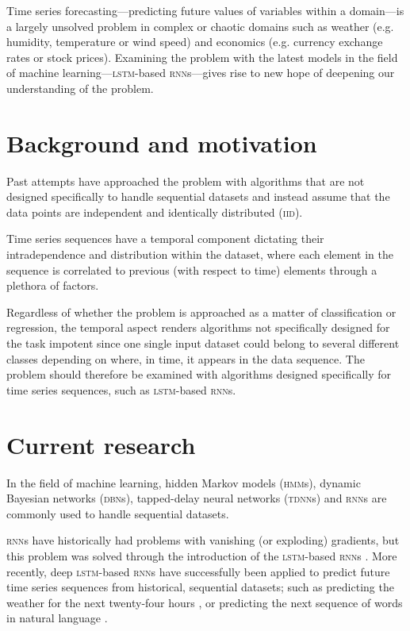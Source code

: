 Time series forecasting---predicting future values of variables within a domain---is a largely unsolved problem in complex or chaotic domains such as weather (e.g. humidity, temperature or wind speed) and economics (e.g. currency exchange rates or stock prices). Examining the problem with the latest models in the field of machine learning---\textsc{lstm}-based \textsc{rnn}s---gives rise to new hope of deepening our understanding of the problem.

\section{Background and motivation}
Past attempts have approached the problem with algorithms that are not designed specifically to handle sequential datasets and instead assume that the data points are independent and identically distributed (\textsc{iid}).

Time series sequences have a temporal component dictating their intradependence and distribution within the dataset, where each element in the sequence is correlated to previous (with respect to time) elements through a plethora of factors.

Regardless of whether the problem is approached as a matter of classification or regression, the temporal aspect renders algorithms not specifically designed for the task impotent since one single input dataset could belong to several different classes depending on where, in time, it appears in the data sequence. The problem should therefore be examined with algorithms designed specifically for time series sequences, such as \textsc{lstm}-based \textsc{rnn}s.

\section{Current research}
In the field of machine learning, hidden Markov models (\textsc{hmm}s), dynamic Bayesian networks (\textsc{dbn}s), tapped-delay neural networks (\textsc{tdnn}s) and \textsc{rnn}s are commonly used to handle sequential datasets.

\textsc{rnn}s have historically had problems with vanishing (or exploding) gradients, but this problem was solved through the introduction of the \textsc{lstm}-based \textsc{rnn}s \citep*{hochreiter1997}. More recently, deep \textsc{lstm}-based \textsc{rnn}s have successfully been applied to predict future time series sequences from historical, sequential datasets; such as predicting the weather for the next twenty-four hours \citep*{zaytar2016}, or predicting the next sequence of words in natural language \citep*{quoc2014}.

